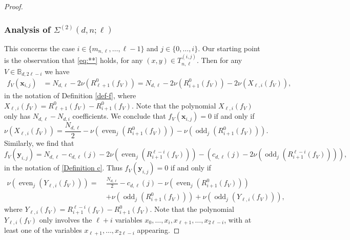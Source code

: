 \documentclass[10pt,a4paper]{amsart}
\DeclareMathOperator{\even}{even}
\DeclareMathOperator{\odd}{odd}
\newcommand{\xx}{\mathbf{x}}
\newcommand{\yy}{\mathbf{y}}
\begin{document}
\begin{proof}
\subsubsection*{Analysis of $\Sigma^{(2)}(d,n;\ell)$}

This concerns the case $i\in \{m_{n,\ell},\dots,\ell-1\}$ and $j\in \{0,\dots,i\}$.
Our starting point is the observation that \eqref{eq:**} holds, 
for  any $(x,y)\in T_{n,\ell}^{(i,j)}$.
Then for any 
$V\in 
 \mathbb{B}_{d,2\ell-i}$ we have 
 \begin{align*}
f_V(\xx_{i,j})
&=N_{d,\ell}-2\nu(R_{\ell+1}^0(f_V))
=
N_{d,\ell}-2\nu(R_{i+1}^0(f_V))-2\nu(X_{\ell,i}(f_V)),
\end{align*}
in the notation of Definition \ref{def-f}, where
$X_{\ell,i}(f_V)=R_{\ell+1}^0(f_V)-R_{i+1}^0(f_V)$.
Note that the polynomial $X_{\ell,i}(f_V)$ only has $N_{d,\ell}-N_{d,i}$ coefficients. 
We conclude that $f_V(\xx_{i,j})=0$ if and only if 
\begin{equation}\label{eq:sun}
\nu(X_{\ell,i}(f_V))=\frac{N_{d,\ell}}{2}-
\nu\left( 
\even_j\left(R_{i+1}^0(f_V)\right)\right)
-\nu\left( 
\odd_j\left(R_{i+1}^0(f_V)\right)\right).
\end{equation}
Similarly, we find that 
 $$
f_V(\yy_{i,j})=N_{d,\ell}-c_{d,\ell}(j)-
2\nu\left( 
\even_j\left(R_{i+1}^{\ell-i}(f_V)\right)\right)
-\left(c_{d,\ell}(j)-
2\nu\left( 
\odd_j\left(R_{i+1}^{\ell-i}(f_V)\right)\right)\right),
$$
in the notation of \eqref{Definition c}.
Thus   $f_V(\yy_{i,j})=0$ if and only if 
\begin{equation}\label{eq:moon}
\begin{split}
\nu\left(\even_j\left( Y_{\ell,i}(f_V)\right)\right)
=~&\frac{N_{d,\ell}}{2}-
c_{d,\ell}(j)-
\nu\left( 
\even_j\left(R_{i+1}^0(f_V)\right)\right)\\
&+\nu\left( 
\odd_j\left(R_{i+1}^0(f_V)\right)\right)
+\nu\left( 
\odd_j\left(Y_{\ell,i}(f_V)\right)\right),
\end{split}
\end{equation}
where 
$Y_{\ell,i}(f_V)=R_{i+1}^{\ell-i}(f_V)-R_{i+1}^0(f_V)$.
Note that the polynomial $Y_{\ell,i}(f_V)$ only involves the 
$\ell+i$
variables
$x_{0},\dots,x_{i}, x_{\ell+1},\dots,x_{2\ell-i}$,
with at least one of the variables $x_{\ell+1},\dots,x_{2\ell-i}$ appearing.


\end{proof}
\end{document}

